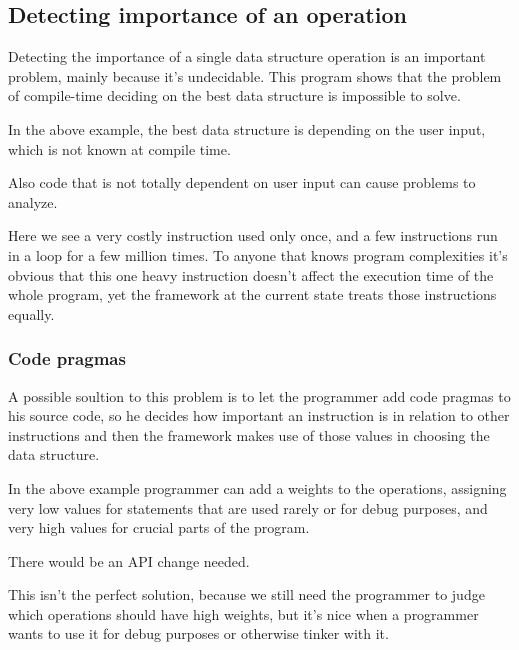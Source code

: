 \documentclass[11pt]{article}
\begin{document}
	\subsection{Detecting importance of an operation}
		Detecting the importance of a single data structure operation is an important problem, mainly because it's undecidable.  This program shows that
		the problem of compile-time deciding on the best data structure is impossible to solve.
		
		In the above example, the best data structure is depending on the user input, which is not known at compile time.

		Also code that is not totally dependent on user input can cause problems to analyze.
		
		Here we see a very costly instruction used only once, and a few instructions run in a loop for a few million times.  To anyone that knows
		program complexities it's obvious that this one heavy instruction doesn't affect the execution time of the whole program, yet the framework at
		the current state treats those instructions equally.

		\subsubsection{Code pragmas}
			A possible soultion to this problem is to let the programmer add code pragmas to his source code, so he decides how important an
			instruction is in relation to other instructions and then the framework makes use of those values in choosing the data structure.
			
			In the above example programmer can add a weights to the operations, assigning very low values for statements that are used rarely or
			for debug purposes, and very high values for crucial parts of the program.

			There would be an API change needed.
			
			This isn't the perfect solution, because we still need the programmer to judge which operations should have high weights, but it's nice
			when a programmer wants to use it for debug purposes or otherwise tinker with it.
\end{document}
